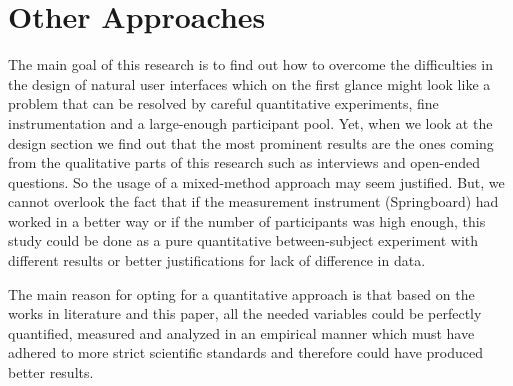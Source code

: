 \documentclass{sigchi}
\begin{document}
\section{Other Approaches}
The main goal of this research is to find out how to overcome the difficulties in the design of natural user interfaces which on the first glance might look like a problem that can be resolved by careful quantitative experiments, fine instrumentation and a large-enough participant pool. Yet, when we look at the design section we find out that the most prominent results are the ones coming from the qualitative parts of this research such as interviews and open-ended questions. So the usage of a mixed-method approach may seem justified. But, we cannot overlook the fact that if the measurement instrument (Springboard) had worked in a better way or if the number of participants was high enough, this study could be done as a pure quantitative between-subject experiment with different results or better justifications for lack of difference in data. 

The main reason for opting for a quantitative approach is that based on the works in literature and this paper, all the needed variables could be perfectly quantified, measured and analyzed in an empirical manner which must have adhered to more strict scientific standards and therefore could have produced better results. 

\balance{}



\end{document}
